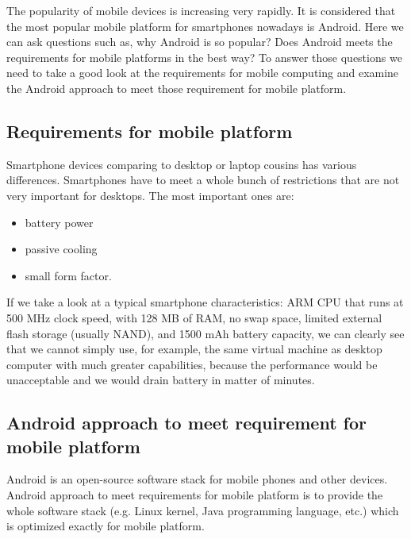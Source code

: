 \documentclass[11pt, oneside]{article}   	%
\begin{document}
The popularity of mobile devices is increasing very rapidly. It is considered that the most popular mobile platform for smartphones nowadays is Android\cite{website:popularplatform2012}. Here we can ask questions such as, why Android is so popular? Does Android meets the requirements for mobile platforms in the best way? To answer those questions we need to take a good look at the requirements for mobile computing and examine the Android approach to meet those requirement for mobile platform. 

\subsection*{Requirements for mobile platform}

Smartphone devices comparing to desktop or laptop cousins has various differences. Smartphones have to meet a whole bunch of restrictions that are not very important for desktops. The most important ones are:
\begin{itemize}
  \itemsep0em
  \item battery power
  \item passive cooling
  \item small form factor.
\end{itemize}
If we take a look at a typical smartphone characteristics: ARM CPU that runs at 500 MHz clock speed, with 128 MB of RAM, no swap space, limited external flash storage (usually NAND), and 1500 mAh battery capacity\cite{website:androiddalvikvm}, we can clearly see that we cannot simply use, for example, the same virtual machine as desktop computer with much greater capabilities, because the performance would be unacceptable and we would drain battery in matter of minutes.

\subsection*{Android approach to meet requirement for mobile platform}

Android is an open-source software stack for mobile phones and other devices\cite{website:androidphylosophy}. Android approach to meet requirements for mobile platform is to provide the whole software stack (e.g. Linux kernel, Java programming language, etc.) which is optimized exactly for mobile platform. 
\end{document}

